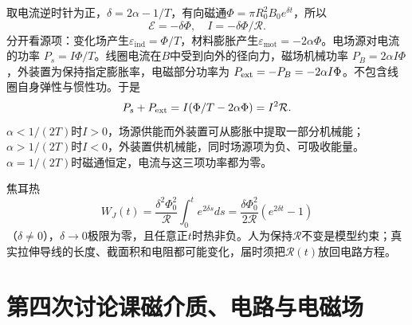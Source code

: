 \documentclass[UTF8,fontset=fandol,zihao=-4,a4paper]{ctexart}
\begin{document}
取电流逆时针为正，\(\delta =2\alpha -1/T\)，有向磁通\(\Phi =\pi R_{0}^{2}B_{0}e^{\delta t}\)，所以
\[
\mathcal E=-\delta\Phi,\quad I=-\delta\Phi/\mathcal R.
\]
分开看源项：变化场产生\(\varepsilon _{\mathrm{ind}}=\Phi /T\)，材料膨胀产生\(\varepsilon _{\mathrm{mot}}=-2\alpha \Phi \)。电场源对电流的功率 \(P_s=I\Phi/T\)。线圈电流在\(B\)中受到向外的径向力，磁场机械功率 \(P_B=2\alpha I\Phi\)，外装置为保持指定膨胀率，电磁部分功率为 \(P_{\rm ext}=-P_B=-2\alpha I\Phi\)。不包含线圈自身弹性与惯性功。于是
\[
P_s+P_{\rm ext}=I(\Phi/T-2\alpha\Phi)=I^2\mathcal R.
\]
\(\alpha <1/(2T)\)时\(I>0\)，场源供能而外装置可从膨胀中提取一部分机械能；\(\alpha >1/(2T)\)时\(I<0\)，外装置供机械能，同时场源项为负、可吸收能量。\(\alpha =1/(2T)\)时磁通恒定，电流与这三项功率都为零。

焦耳热
\[
W_J(t)=\frac{\delta^2\Phi_0^2}{\mathcal R}
\int_0^t e^{2\delta s}ds
=\frac{\delta\Phi_0^2}{2\mathcal R}(e^{2\delta t}-1)
\]
（\(\delta \ne 0\)），\(\delta \to 0\)极限为零，且任意正\(t\)时热非负。人为保持\(\mathcal R \)不变是模型约束；真实拉伸导线的长度、截面积和电阻都可能变化，届时须把\(\mathcal R (t)\)放回电路方程。

\clearpage
\section{第四次讨论课\quad 磁介质、电路与电磁场}
\end{document}
